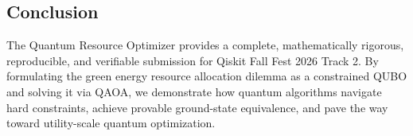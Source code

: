 \subsection{Conclusion}
The Quantum Resource Optimizer provides a complete, mathematically rigorous, reproducible, and verifiable submission for Qiskit Fall Fest 2026 Track 2. By formulating the green energy resource allocation dilemma as a constrained QUBO and solving it via QAOA, we demonstrate how quantum algorithms navigate hard constraints, achieve provable ground-state equivalence, and pave the way toward utility-scale quantum optimization.
